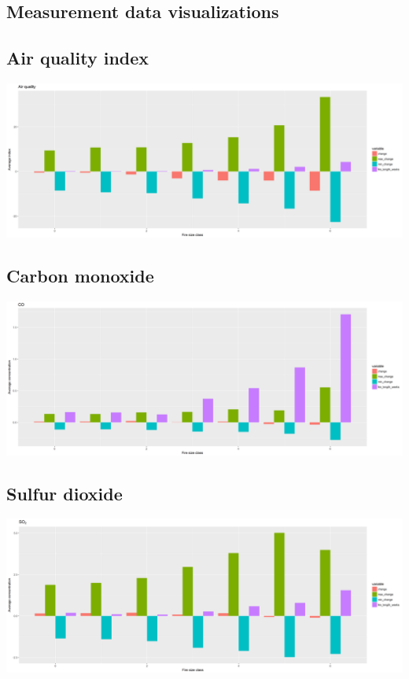 \documentclass[a4paper,12pt]{article}
\begin{document}
\begin{landscape}
\begin{appendices}
\section{Measurement data visualizations}
\subsection{Air quality index}
\includegraphics[scale=0.5]{aqi_time_series.png}
\subsection{Carbon monoxide}
\includegraphics[scale=0.5]{co_time_series.png}
\subsection{Sulfur dioxide}
\includegraphics[scale=0.5]{so2_time_series.png}
\end{appendices}
\end{landscape}

\nocite{*}
\printbibliography[title={Bibliography},heading=bibliography]
\end{document}
